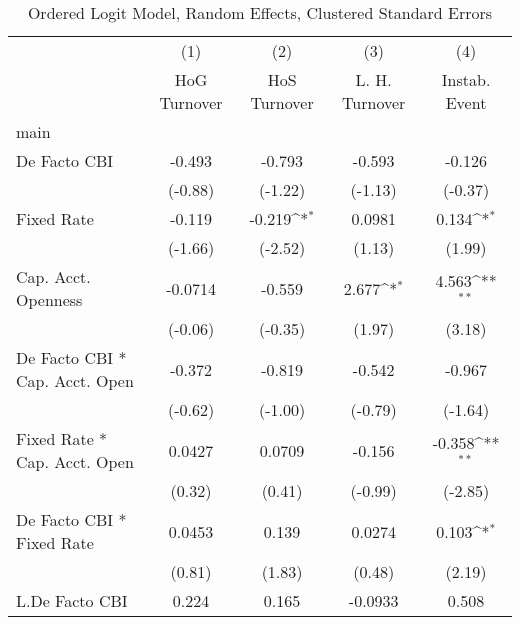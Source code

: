 {
\def\sym#1{\ifmmode^{#1}\else\(^{#1}\)\fi}
\begin{longtable}{l*{4}{c}}
\caption{Ordered Logit Model, Random Effects, Clustered Standard Errors \label{kapintlagordLogLogDF}}\\
\hline\hline\endfirsthead\hline\endhead\hline\endfoot\endlastfoot
                &\multicolumn{1}{c}{(1)}&\multicolumn{1}{c}{(2)}&\multicolumn{1}{c}{(3)}&\multicolumn{1}{c}{(4)}\\
                &\multicolumn{1}{c}{HoG Turnover}&\multicolumn{1}{c}{HoS Turnover}&\multicolumn{1}{c}{L. H. Turnover}&\multicolumn{1}{c}{Instab. Event}\\
\hline
main            &                  &                  &                  &                  \\
De Facto CBI    &   -0.493         &   -0.793         &   -0.593         &   -0.126         \\
                &  (-0.88)         &  (-1.22)         &  (-1.13)         &  (-0.37)         \\
[1em]
Fixed Rate      &   -0.119         &   -0.219\sym{*}  &   0.0981         &    0.134\sym{*}  \\
                &  (-1.66)         &  (-2.52)         &   (1.13)         &   (1.99)         \\
[1em]
Cap. Acct. Openness&  -0.0714         &   -0.559         &    2.677\sym{*}  &    4.563\sym{**} \\
                &  (-0.06)         &  (-0.35)         &   (1.97)         &   (3.18)         \\
[1em]
De Facto CBI * Cap. Acct. Open&   -0.372         &   -0.819         &   -0.542         &   -0.967         \\
                &  (-0.62)         &  (-1.00)         &  (-0.79)         &  (-1.64)         \\
[1em]
Fixed Rate * Cap. Acct. Open&   0.0427         &   0.0709         &   -0.156         &   -0.358\sym{**} \\
                &   (0.32)         &   (0.41)         &  (-0.99)         &  (-2.85)         \\
[1em]
De Facto CBI * Fixed Rate&   0.0453         &    0.139         &   0.0274         &    0.103\sym{*}  \\
                &   (0.81)         &   (1.83)         &   (0.48)         &   (2.19)         \\
[1em]
L.De Facto CBI  &    0.224         &    0.165         &  -0.0933         &    0.508         \\

\end{longtable}}
